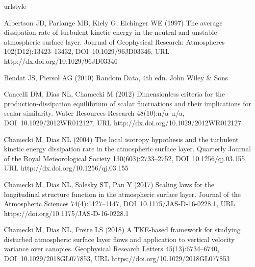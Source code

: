 \documentclass{svjour3}                     %
\begin{document}
\begin{thebibliography}{26}
\providecommand{\natexlab}[1]{#1}
\providecommand{\url}[1]{{#1}}
\providecommand{\urlprefix}{URL }
\expandafter\ifx\csname urlstyle\endcsname\relax
  \providecommand{\doi}[1]{DOI~\discretionary{}{}{}#1}\else
  \providecommand{\doi}{DOI~\discretionary{}{}{}\begingroup
  \urlstyle{rm}\Url}\fi
\providecommand{\eprint}[2][]{\url{#2}}

Albertson JD, Parlange MB, Kiely G, Eichinger WE (1997) The average dissipation
  rate of turbulent kinetic energy in the neutral and unstable atmospheric
  surface layer. Journal of Geophysical Research: Atmospheres
  102(D12):13423--13432, \doi{10.1029/96JD03346},
  \urlprefix\url{http://dx.doi.org/10.1029/96JD03346}

Bendat JS, Piersol AG (2010) Random Data, 4th edn. John Wiley \& Sons

Cancelli DM, Dias NL, Chamecki M (2012) Dimensionless criteria for the
  production-dissipation equilibrium of scalar fluctuations and their
  implications for scalar similarity. Water Resources Research 48(10):n/a--n/a,
  \doi{10.1029/2012WR012127},
  \urlprefix\url{http://dx.doi.org/10.1029/2012WR012127}

Chamecki M, Dias NL (2004) The local isotropy hypothesis and the turbulent
  kinetic energy dissipation rate in the atmospheric surface layer. Quarterly
  Journal of the Royal Meteorological Society 130(603):2733--2752,
  \doi{10.1256/qj.03.155}, \urlprefix\url{http://dx.doi.org/10.1256/qj.03.155}

Chamecki M, Dias NL, Salesky ST, Pan Y (2017) Scaling laws for the longitudinal
  structure function in the atmospheric surface layer. Journal of the
  Atmospheric Sciences 74(4):1127--1147, \doi{10.1175/JAS-D-16-0228.1},
  \urlprefix\url{https://doi.org/10.1175/JAS-D-16-0228.1}

Chamecki M, Dias NL, Freire LS (2018) A {TKE}-based framework for studying
  disturbed atmospheric surface layer flows and application to vertical
  velocity variance over canopies. Geophysical Research Letters
  45(13):6734--6740, \doi{10.1029/2018GL077853},
  \urlprefix\url{https://doi.org/10.1029/2018GL077853}


\end{thebibliography}
\end{document}
